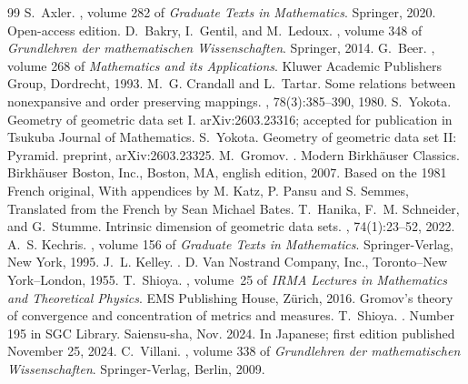 \documentclass[10pt,a4paper]{amsart}
\begin{document}
\begin{thebibliography}{99}
 S.~Axler. , volume 282 of {\em Graduate Texts in Mathematics}. \newblock Springer, 2020. \newblock Open-access edition.
 D.~Bakry, I.~Gentil, and M.~Ledoux. , volume 348 of {\em Grundlehren der mathematischen Wissenschaften}. \newblock Springer, 2014.
 G.~Beer. , volume 268 of {\em Mathematics and its Applications}. \newblock Kluwer Academic Publishers Group, Dordrecht, 1993.
 M.~G. Crandall and L.~Tartar. \newblock Some relations between nonexpansive and order preserving mappings. , 78(3):385--390, 1980.
 S.~Yokota. \newblock Geometry of geometric data set {I}. \newblock arXiv:2603.23316; accepted for publication in Tsukuba Journal of Mathematics.
 S.~Yokota. \newblock Geometry of geometric data set {II}: {P}yramid. \newblock preprint, arXiv:2603.23325.
 M.~Gromov. . \newblock Modern Birkh\"auser Classics. Birkh\"auser Boston, Inc., Boston, MA, english edition, 2007. \newblock Based on the 1981 French original, With appendices by M. Katz, P. Pansu and S. Semmes, Translated from the French by Sean Michael Bates.
 T.~Hanika, F.~M. Schneider, and G.~Stumme. \newblock Intrinsic dimension of geometric data sets. , 74(1):23--52, 2022.
 A.~S. Kechris. , volume 156 of {\em Graduate Texts in Mathematics}. \newblock Springer-Verlag, New York, 1995.
 J.~L. Kelley. . \newblock D. Van Nostrand Company, Inc., Toronto--New York--London, 1955.
 T.~Shioya. , volume~25 of {\em IRMA Lectures in Mathematics and Theoretical Physics}. \newblock EMS Publishing House, Z\"urich, 2016. \newblock Gromov's theory of convergence and concentration of metrics and measures.
 T.~Shioya. . \newblock Number 195 in SGC Library. Saiensu-sha, Nov. 2024. \newblock In Japanese; first edition published November 25, 2024.
 C.~Villani. , volume 338 of {\em Grundlehren der mathematischen Wissenschaften}. \newblock Springer-Verlag, Berlin, 2009.
\end{thebibliography}
\end{document}
